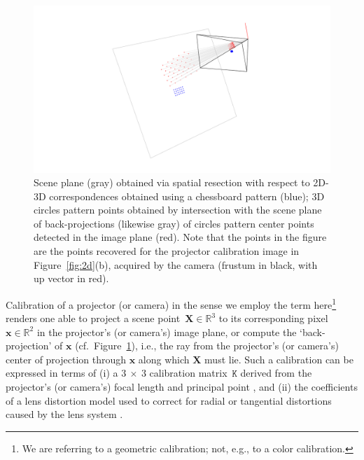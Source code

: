 \documentclass[review]{elsarticle}
\begin{document}
\begin{figure}
    \centerline{\includegraphics[scale=.35]{images/2d3d.png}}
    \caption{Scene plane (gray) obtained via spatial resection with respect to 2D-3D correspondences obtained using a chessboard pattern (blue); 3D circles pattern points obtained by intersection with the scene plane of back-projections (likewise gray) of circles pattern center points detected in the image plane (red). Note that the points in the figure are the points recovered for the projector calibration image in Figure~\ref{fig:2d}(b), acquired by the camera (frustum in black, with up vector in red).}
    \label{fig:3d}
\end{figure}


Calibration of a projector (or camera) in the sense we employ the term here\footnote{We are referring to a geometric calibration; not, e.g., to a color calibration.} renders one able to project a scene point~$\mathbf{X} \in \mathbb{R}^3$ to its corresponding pixel~$\mathbf{x} \in \mathbb{R}^2$ in the projector's (or camera's) image plane, or compute the `back-projection' of $\mathbf{x}$ (cf.\ Figure~\ref{fig:3d}), i.e., the ray from the projector's (or camera's) center of projection through $\mathbf{x}$ along which $\mathbf{X}$ must lie. Such a calibration can be expressed in terms of (i) a $3~\times{}~3$ calibration matrix~$\mathtt{K}$ derived from the projector's (or camera's) focal length and principal point \cite{Hartley2004}, and (ii) the coefficients of a lens distortion model used to correct for radial or tangential distortions caused by the lens system \cite{duane1971close}.
\end{document}
